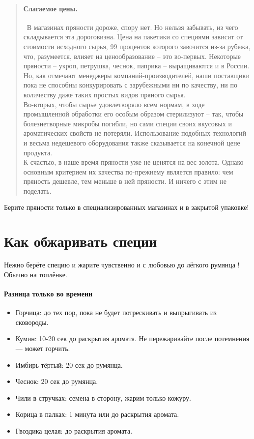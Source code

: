 \begin{quote}
{\paragraph{Слагаемое цены.}\ В магазинах пряности дороже, спору нет. Но нельзя забывать, из чего складывается эта дороговизна. Цена на пакетики со специями зависит от стоимости исходного сырья, 99 процентов которого завозится из-за рубежа, что, разумеется, влияет на ценообразование – это во-первых. Некоторые пряности – укроп, петрушка, чеснок, паприка – выращиваются и в России. Но, как отмечают менеджеры компаний-производителей, наши поставщики пока не способны конкурировать с зарубежными ни по качеству, ни по количеству даже таких простых видов пряного сырья. 
\\
Во-вторых, чтобы сырье удовлетворяло всем нормам, в ходе промышленной обработки его особым образом стерилизуют – так, чтобы болезнетворные микробы погибли, но сами специи своих вкусовых и ароматических свойств не потеряли. Использование подобных технологий и весьма недешевого оборудования также сказывается на конечной цене продукта. 
\\
К счастью, в наше время пряности уже не ценятся на вес золота. Однако основным критерием их качества по-прежнему является правило: чем пряность дешевле, тем меньше в ней пряности. И ничего с этим не поделать.
    }
\end{quote}

Берите пряности только в специализированных магазинах и в закрытой упаковке!

\section{Как обжаривать специи}

Нежно берёте специю и жарите чувственно и с любовью до лёгкого румянца \faHeart! 
Обычно на топлёнке.
\paragraph{Разница только во времени}
\begin{itemize}
\item Горчица: до тех пор, пока не будет потрескивать и выпрыгивать из сковороды.
\item Кумин: 10-20 сек до раскрытия аромата. Не пережаривайте после потемнения — может горчить.
\item Имбирь тёртый: 20 сек до румянца.
\item Чеснок: 20 сек до румянца.
\item Чили в стручках: семена в сторону, жарим только кожуру.
\item Корица в палках: 1 минута или до раскрытия аромата.
\item Гвоздика целая: до раскрытия аромата.
\end{itemize}


